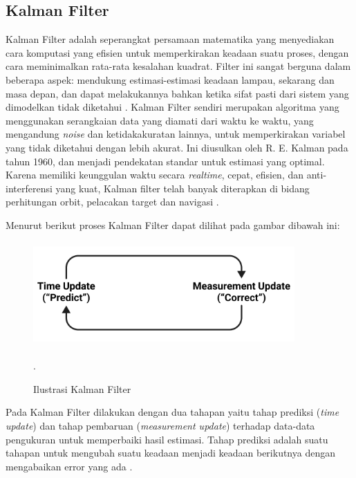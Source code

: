 \subsection{Kalman Filter}
Kalman Filter adalah seperangkat persamaan matematika yang menyediakan cara komputasi yang efisien untuk memperkirakan keadaan suatu proses, dengan cara meminimalkan rata-rata kesalahan kuadrat. Filter ini sangat berguna dalam beberapa aspek: mendukung estimasi-estimasi keadaan lampau, sekarang dan masa depan, dan dapat melakukannya bahkan ketika sifat pasti dari sistem yang dimodelkan tidak diketahui \cite{welch2020kalman}. Kalman Filter sendiri merupakan algoritma yang menggunakan serangkaian data yang diamati dari waktu ke waktu, yang mengandung \textit{noise} dan ketidakakuratan lainnya, untuk memperkirakan variabel yang tidak diketahui dengan lebih akurat. Ini diusulkan oleh R. E. Kalman pada tahun 1960, dan menjadi pendekatan standar untuk estimasi yang optimal. Karena memiliki keunggulan waktu secara \textit{realtime}, cepat, efisien, dan anti-interferensi yang kuat, Kalman filter telah banyak diterapkan di bidang perhitungan orbit, pelacakan target dan navigasi \cite{li2015kalman}.

\par Menurut \citep{ihsan2018analisis} berikut proses Kalman Filter dapat dilihat pada gambar dibawah ini:
\begin{figure}[H]
\centering
{\includegraphics [width = 10cm, height= 4cm]{gambar/bab2/kalman_filter}}
\caption{Ilustrasi Kalman Filter \citep{ihsan2018analisis}}.
\label{img:kalman_filter}
\end{figure}

Pada Kalman Filter dilakukan dengan dua tahapan yaitu tahap prediksi (\textit{time update}) dan tahap pembaruan (\textit{measurement update}) terhadap data-data pengukuran untuk memperbaiki hasil estimasi. Tahap prediksi adalah suatu tahapan untuk mengubah suatu keadaan menjadi keadaan berikutnya dengan mengabaikan error yang ada \citep{ihsan2018analisis}.

